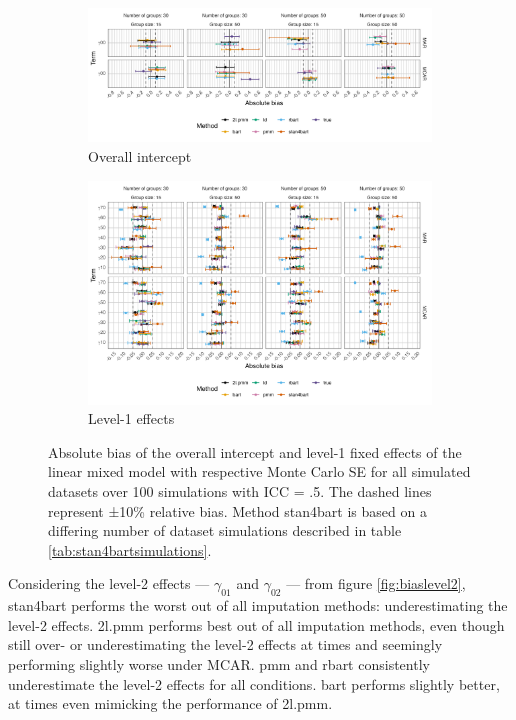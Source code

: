 \documentclass[3p,12pt,a4paper]{elsarticle}
\begin{document}
\begin{figure}[H]
    \centering 
    \begin{subfigure}[b]{1\textwidth}
        \centering
        \includegraphics[width=1\textwidth]{biasintercept.png}
        \caption{Overall intercept}
        \label{fig:biasintercept}
    \end{subfigure}
    \begin{subfigure}[b]{1\textwidth}
        \centering 
        \includegraphics[width=1\textwidth]{biaslevel1.png}
        \caption{Level-1 effects}
        \label{fig:biaslevel1}
    \end{subfigure}
    \caption{Absolute bias of the overall intercept and level-1 fixed effects of the linear mixed model with respective Monte Carlo SE for all simulated datasets over 100 simulations with ICC = .5. The dashed lines represent ±10\% relative bias. Method stan4bart is based on a differing number of dataset simulations described in table \ref{tab:stan4bartsimulations}.}
    \label{fig:biasinterceptlevel1}
\end{figure}
Considering the level-2 effects --- $\gamma_{01}$ and $\gamma_{02}$ --- from figure \ref{fig:biaslevel2}, stan4bart performs the worst out of all imputation methods: underestimating the level-2 effects. 2l.pmm performs best out of all imputation methods, even though still over- or underestimating the level-2 effects at times and seemingly performing slightly worse under MCAR. pmm and rbart consistently underestimate the level-2 effects for all conditions. bart performs slightly better, at times even mimicking the performance of 2l.pmm. 
\end{document}
